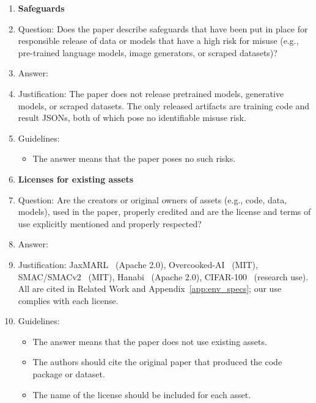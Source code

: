 \begin{enumerate}
\item {\bf Safeguards}
    \item[] Question: Does the paper describe safeguards that have been put in place for responsible release of data or models that have a high risk for misuse (e.g., pre-trained language models, image generators, or scraped datasets)?
    \item[] Answer: \answerNA{}
    \item[] Justification: The paper does not release pretrained models, generative models, or scraped datasets. The only released artifacts are training code and result JSONs, both of which pose no identifiable misuse risk.
    \item[] Guidelines:
    \begin{itemize}
        \item The answer \answerNA{} means that the paper poses no such risks.
    \end{itemize}

\item {\bf Licenses for existing assets}
    \item[] Question: Are the creators or original owners of assets (e.g., code, data, models), used in the paper, properly credited and are the license and terms of use explicitly mentioned and properly respected?
    \item[] Answer: \answerYes{}
    \item[] Justification: JaxMARL~\cite{rutherford2024jaxmarl} (Apache 2.0), Overcooked-AI~\cite{carroll2019utility} (MIT), SMAC/SMACv2~\cite{samvelyan2019starcraft,ellis2023smacv2} (MIT), Hanabi~\cite{bard2020hanabi} (Apache 2.0), CIFAR-100~\cite{krizhevsky2009learning} (research use). All are cited in Related Work and Appendix~\ref{app:env_specs}; our use complies with each license.
    \item[] Guidelines:
    \begin{itemize}
        \item The answer \answerNA{} means that the paper does not use existing assets.
        \item The authors should cite the original paper that produced the code package or dataset.
        \item The name of the license should be included for each asset.
    \end{itemize}


\end{enumerate}

